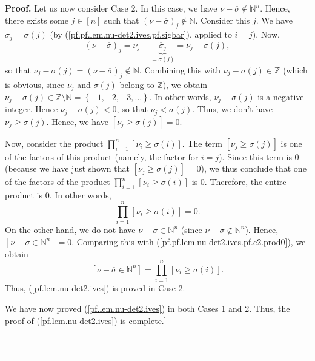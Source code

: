 \documentclass[numbers=enddot,12pt,final,onecolumn,notitlepage,english]{scrartcl}%
\theoremstyle{definition}
\newenvironment{proof}[1][Proof]{\noindent\textbf{#1.} }{\ \rule{0.5em}{0.5em}}
\let\prodnonlimits\prod
\renewcommand{\prod}{\prodnonlimits\limits}
\newenvironment{verlong}{}{}
\begin{document}
\begin{verlong}
\begin{proof}
Let us now consider Case 2. In this case, we have $\nu-\overline{\sigma}%
\notin\mathbb{N}^{n}$. Hence, there exists some $j\in\left[  n\right]  $ such
that $\left(  \nu-\overline{\sigma}\right)  _{j}\notin\mathbb{N}$. Consider
this $j$. We have $\overline{\sigma}_{j}=\sigma\left(  j\right)  $ (by
(\ref{pf.pf.lem.nu-det2.ives.pf.sigbar}), applied to $i=j$). Now,
\[
\left(  \nu-\overline{\sigma}\right)  _{j}=\nu_{j}-\underbrace{\overline
{\sigma}_{j}}_{=\sigma\left(  j\right)  }=\nu_{j}-\sigma\left(  j\right)  ,
\]
so that $\nu_{j}-\sigma\left(  j\right)  =\left(  \nu-\overline{\sigma
}\right)  _{j}\notin\mathbb{N}$. Combining this with $\nu_{j}-\sigma\left(
j\right)  \in\mathbb{Z}$ (which is obvious, since $\nu_{j}$ and $\sigma\left(
j\right)  $ belong to $\mathbb{Z}$), we obtain $\nu_{j}-\sigma\left(
j\right)  \in\mathbb{Z}\setminus\mathbb{N}=\left\{  -1,-2,-3,\ldots\right\}
$. In other words, $\nu_{j}-\sigma\left(  j\right)  $ is a negative integer.
Hence $\nu_{j}-\sigma\left(  j\right)  <0$, so that $\nu_{j}<\sigma\left(
j\right)  $. Thus, we don't have $\nu_{j}\geq\sigma\left(  j\right)  $. Hence,
we have $\left[  \nu_{j}\geq\sigma\left(  j\right)  \right]  =0$.

Now, consider the product $\prod_{i=1}^{n}\left[  \nu_{i}\geq\sigma\left(
i\right)  \right]  $. The term $\left[  \nu_{j}\geq\sigma\left(  j\right)
\right]  $ is one of the factors of this product (namely, the factor for
$i=j$). Since this term is $0$ (because we have just shown that $\left[
\nu_{j}\geq\sigma\left(  j\right)  \right]  =0$), we thus conclude that one of
the factors of the product $\prod_{i=1}^{n}\left[  \nu_{i}\geq\sigma\left(
i\right)  \right]  $ is $0$. Therefore, the entire product is $0$. In other
words,
\begin{equation}
\prod_{i=1}^{n}\left[  \nu_{i}\geq\sigma\left(  i\right)  \right]  =0.
\label{pf.pf.lem.nu-det2.ives.pf.c2.prod0}%
\end{equation}
On the other hand, we do not have $\nu-\overline{\sigma}\in\mathbb{N}^{n}$
(since $\nu-\overline{\sigma}\notin\mathbb{N}^{n}$). Hence, $\left[
\nu-\overline{\sigma}\in\mathbb{N}^{n}\right]  =0$. Comparing this with
(\ref{pf.pf.lem.nu-det2.ives.pf.c2.prod0}), we obtain%
\[
\left[  \nu-\overline{\sigma}\in\mathbb{N}^{n}\right]  =\prod_{i=1}^{n}\left[
\nu_{i}\geq\sigma\left(  i\right)  \right]  .
\]
Thus, (\ref{pf.lem.nu-det2.ives}) is proved in Case 2. \medskip

We have now proved (\ref{pf.lem.nu-det2.ives}) in both Cases 1 and 2. Thus,
the proof of (\ref{pf.lem.nu-det2.ives}) is complete.] \medskip


\end{proof}
\end{verlong}
\end{document}
